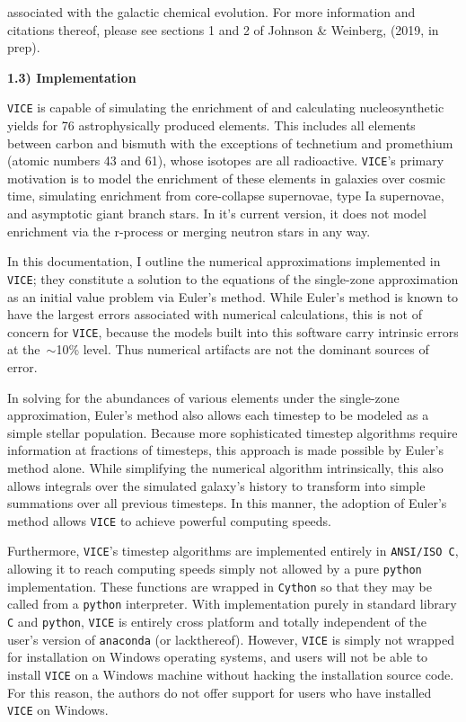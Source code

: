 \documentclass{report}
\begin{document}
associated with the galactic chemical evolution. For more information and 
citations thereof, please see sections 1 and 2 of Johnson \& Weinberg, (2019, 
in prep). 
\par\null\par\noindent 
\hypertarget{background:implementation}{\textbf{1.3) Implementation}}
\par\noindent 
\texttt{VICE} is capable of simulating the enrichment of and calculating 
nucleosynthetic yields for 76 astrophysically produced elements. This includes 
all elements between carbon and bismuth with the exceptions of technetium and 
promethium (atomic numbers 43 and 61), whose isotopes are all radioactive. 
\texttt{VICE}'s primary motivation is to model the enrichment of these 
elements in galaxies over cosmic time, simulating enrichment from core-collapse 
supernovae, type Ia supernovae, and asymptotic giant branch stars. In it's 
current version, it does not model enrichment via the r-process or merging 
neutron stars in any way. 
\par
In this documentation, I outline the numerical approximations implemented in 
\texttt{VICE}; they constitute a solution to the equations of the single-zone 
approximation as an initial value problem via Euler's method. While Euler's 
method is known to have the largest errors associated with numerical 
calculations, this is not of concern for \texttt{VICE}, because the models 
built into this software carry intrinsic errors at the~$\sim$10\% level. Thus 
numerical artifacts are not the dominant sources of error. 
\par
In solving for the abundances of various elements under the single-zone 
approximation, Euler's method also allows each timestep to be modeled as a 
simple stellar population. Because more sophisticated timestep algorithms 
require information at fractions of timesteps, this approach is made possible 
by Euler's method alone. While simplifying the numerical algorithm 
intrinsically, this also allows integrals over the simulated galaxy's history 
to transform into simple summations over all previous timesteps. In this 
manner, the adoption of Euler's method allows \texttt{VICE} to achieve 
powerful computing speeds. 
\par
Furthermore, \texttt{VICE}'s timestep algorithms are implemented entirely in 
\texttt{ANSI/ISO C}, allowing it to reach computing speeds simply not allowed 
by a pure \texttt{python} implementation. These functions are wrapped in 
\texttt{Cython} so that they may be called from a \texttt{python} interpreter. 
With implementation purely in standard library \texttt{C} and \texttt{python}, 
\texttt{VICE} is entirely cross platform and totally independent of the user's 
version of \texttt{anaconda} (or lackthereof). However, \texttt{VICE} is 
simply not wrapped for installation on Windows operating systems, and users 
will not be able to install \texttt{VICE} on a Windows machine without hacking 
the installation source code. For this reason, the authors do not offer support 
for users who have installed \texttt{VICE} on Windows. 
\end{document}
